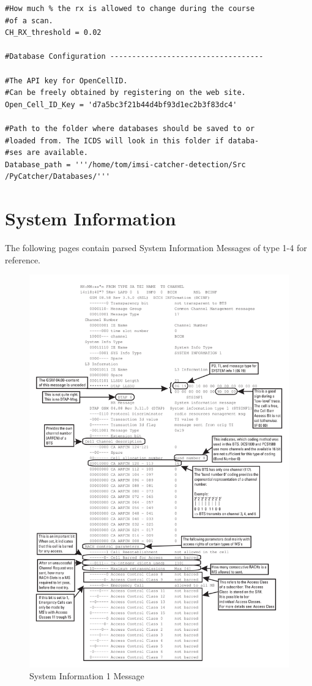 \begin{lstlisting}
#How much % the rx is allowed to change during the course
#of a scan.
CH_RX_threshold = 0.02

#Database Configuration -----------------------------------

#The API key for OpenCellID.
#Can be freely obtained by registering on the web site. 
Open_Cell_ID_Key = 'd7a5bc3f21b44d4bf93d1ec2b3f83dc4'

#Path to the folder where databases should be saved to or
#loaded from. The ICDS will look in this folder if databa-
#ses are available.
Database_path = '''/home/tom/imsi-catcher-detection/Src
/PyCatcher/Databases/'''
\end{lstlisting}

\chapter{System Information}
\label{sec:system_infos}
The following pages contain parsed System Information Messages of type 1-4  for reference.
\begin{figure}
\centering
\includegraphics[width=.9\textwidth]{../Images/sysinfo1}
\caption{System Information 1 Message}
\end{figure}
